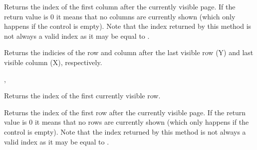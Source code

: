 


\label{wxhvscrolledwindowgetvisiblecolumnsend}


Returns the index of the first column after the currently visible page. If the
return value is $0$ it means that no columns are currently shown (which only
happens if the control is empty). Note that the index returned by this method
is not always a valid index as it may be equal to 
.




\label{wxhvscrolledwindowgetvisiblebegin}


Returns the indicies of the row and column after the last visible row (Y) and
last visible column (X), respectively.


, 


\label{wxhvscrolledwindowgetvisiblerowsbegin}


Returns the index of the first currently visible row.




\label{wxhvscrolledwindowgetvisiblerowsend}


Returns the index of the first row after the currently visible page. If the
return value is $0$ it means that no rows are currently shown (which only
happens if the control is empty). Note that the index returned by this method
is not always a valid index as it may be equal to 
.

